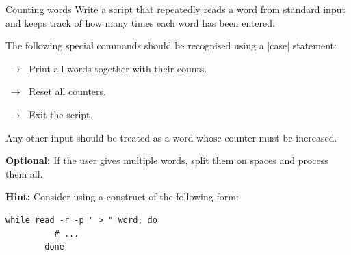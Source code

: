 
\begin{exercise}[Instructive]{Counting words}
    Write a script that repeatedly reads a word from standard input and keeps track of how many times each word has been entered.

    The following special commands should be recognised using a \bash|case| statement:
    \begin{description}[labelwidth=2cm, leftmargin=!, align=right, font=\normalfont]
        \item[\texttt{show} or \texttt{s}]  $\;\to\;$ Print all words together with their counts.
        \item[\texttt{reset} or \texttt{r}] $\;\to\;$ Reset all counters.
        \item[\texttt{quit} or \texttt{q}]  $\;\to\;$ Exit the script.
    \end{description}

    Any other input should be treated as a word whose counter must be increased.

    \textbf{Optional:} If the user gives multiple words, split them on spaces and process them all.

    \textbf{Hint:} Consider using a construct of the following form:
    \begin{lstlisting}[style=MyBash, numbers=none]
        while read -r -p " > " word; do
          # ...
        done
    \end{lstlisting}
\end{exercise}